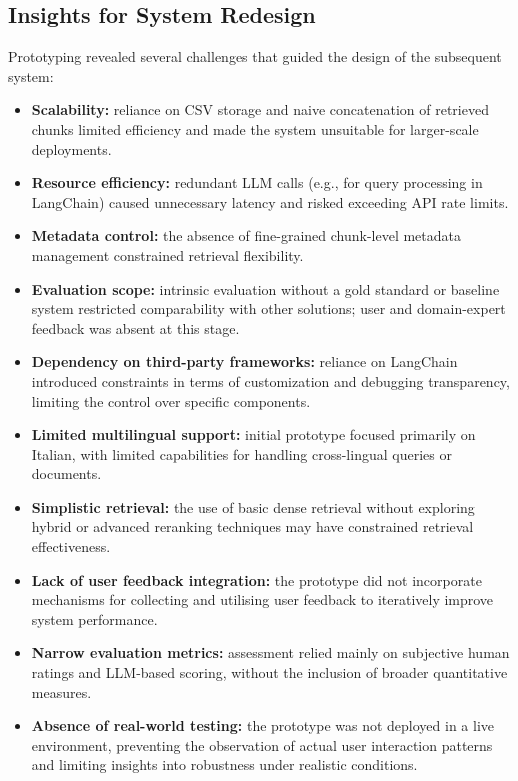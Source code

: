 \begin{spacing}{1.5}
\subsection{Insights for System Redesign}
Prototyping revealed several challenges that guided the design of the subsequent system:
\begin{itemize}
      \item \textbf{Scalability:} reliance on CSV storage and naive concatenation of retrieved chunks limited efficiency and made the system unsuitable for larger-scale deployments.
      \item \textbf{Resource efficiency:} redundant LLM calls (e.g., for query processing in LangChain) caused unnecessary latency and risked exceeding API rate limits.
      \item \textbf{Metadata control:} the absence of fine-grained chunk-level metadata management constrained retrieval flexibility.
      \item \textbf{Evaluation scope:} intrinsic evaluation without a gold standard or baseline system restricted comparability with other solutions; user and domain-expert feedback was absent at this stage.
      \item \textbf{Dependency on third-party frameworks:} reliance on LangChain introduced constraints in terms of customization and debugging transparency, limiting the control over specific components.
      \item \textbf{Limited multilingual support:} initial prototype focused primarily on Italian, with limited capabilities for handling cross-lingual queries or documents.
      \item \textbf{Simplistic retrieval:} the use of basic dense retrieval without exploring hybrid or advanced reranking techniques may have constrained retrieval effectiveness.
      \item \textbf{Lack of user feedback integration:} the prototype did not incorporate mechanisms for collecting and utilising user feedback to iteratively improve system performance.
      \item \textbf{Narrow evaluation metrics:} assessment relied mainly on subjective human ratings and LLM-based scoring, without the inclusion of broader quantitative measures.
      \item \textbf{Absence of real-world testing:} the prototype was not deployed in a live environment, preventing the observation of actual user interaction patterns and limiting insights into robustness under realistic conditions.
\end{itemize}


\end{spacing}
